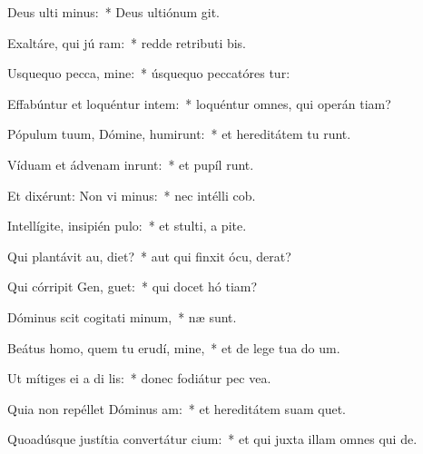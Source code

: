 \item Deus ulti minus:~* Deus ultiónum  git.
\item Exaltáre, qui jú ram:~* redde retributi bis.
\item Usquequo pecca, mine:~* úsquequo peccatóres tur:
\item Effabúntur et loquéntur intem:~* loquéntur omnes, qui operán tiam?
\item Pópulum tuum, Dómine, humirunt:~* et hereditátem tu runt.
\item Víduam et ádvenam inrunt:~* et pupíl runt.
\item Et dixérunt: Non vi minus:~* nec intélli  cob.
\item Intellígite, insipién  pulo:~* et stulti, a pite.
\item Qui plantávit au,  diet?~* aut qui finxit ócu,  derat?
\item Qui córripit Gen,  guet:~* qui docet hó tiam?
\item Dóminus scit cogitati minum,~*  næ sunt.
\item Beátus homo, quem tu erudí, mine,~* et de lege tua do um.
\item Ut mítiges ei a di lis:~* donec fodiátur pec vea.
\item Quia non repéllet Dóminus  am:~* et hereditátem suam  quet.
\item Quoadúsque justítia convertátur  cium:~* et qui juxta illam omnes qui   de.
